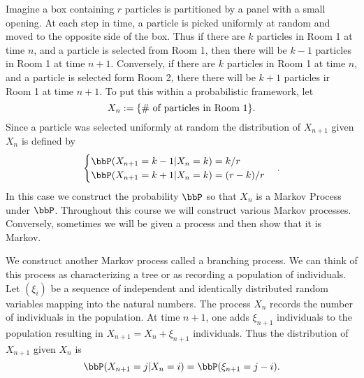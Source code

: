 \documentclass{report}
\begin{document}
\begin{example}

Imagine a box containing $r$ particles is partitioned by a panel with a small opening.  At each step in time, a particle is picked uniformly at random and moved to the opposite side of the box.  Thus if there are $k$ particles in Room 1 at time $n$, and a particle is selected from Room 1, then there will be $k-1$ particles in Room 1 at time $n+1$.  Conversely, if there are $k$ particles in Room 1 at time $n$, and a particle is selected form Room 2, there there will be $k+1$ particles ir Room 1 at time $n+1$.  To put this within a probabilistic framework, let
\[
X_n := \{ \# \textmd{ of particles in Room 1} \}.
\]
Since a particle was selected uniformly at random the  distribution of $X_{n+1}$ given $X_n$ is defined by
\[
\begin{cases}
\bbP(X_{n+1} = k-1 | X_n = k) = k/r \\
\bbP(X_{n+1} = k+1 | X_n = k) = (r-k)/r
\end{cases}.
\]
In this case we construct the probability $\bbP$ so that $X_n$ is a Markov Process under $\bbP$.  Throughout this course we will construct various Markov processes.  Conversely, sometimes we will be given a process and then show that it is Markov.
\end{example}

\begin{example}
We construct another Markov process called a branching process.  We can think of this process as characterizing a tree or as recording a population of individuals.  Let $(\xi_i)$ be a sequence of independent and identically distributed random variables mapping into the natural numbers.  The process $X_n$ records the number of individuals in the population.  At time $n+1$, one adds $\xi_{n+1}$ individuals to the population resulting in $X_{n+1} = X_n + \xi_{n+1}$ individuals.  Thus the distribution of $X_{n+1}$ given $X_n$ is
\[
\bbP(X_{n+1} = j | X_n = i) = \bbP(\xi_{n+1} = j-i).
\]
\end{example}

\begin{example}

\end{example}
\end{document}
